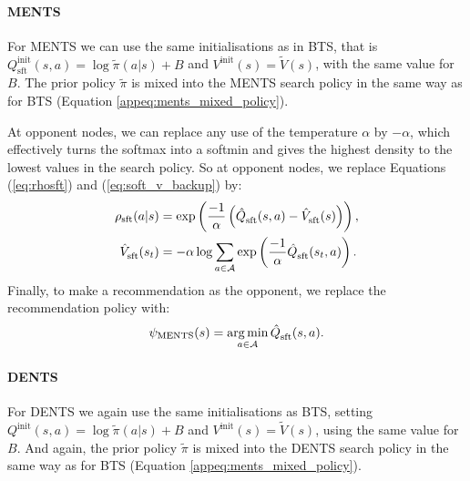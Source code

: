 \documentclass{article}
\newcommand{\cl}[1]{\mathcal{#1}}
\newcommand{\Vst}[2]{\hat{V}^{#2}_{\textnormal{sft}}(#1)}
\newcommand{\Qst}[3]{\hat{Q}^{#3}_{\textnormal{sft}}(#1,#2)}
\DeclareMathOperator*{\argmin}{arg\,min}
\theoremstyle{plain}
\begin{document}
\begin{appendices}
            \paragraph{MENTS}
            For MENTS we can use the same initialisations as in BTS, that is $Q^{\text{init}}_{\text{sft}}(s,a)=\log \tilde{\pi}(a|s)+B$ and $V^{\text{init}}(s)=\tilde{V}(s)$, with the same value for $B$. The prior policy $\tilde{\pi}$ is mixed into the MENTS search policy in the same way as for BTS (Equation \ref{appeq:ments_mixed_policy}). 

            At opponent nodes, we can replace any use of the temperature $\alpha$ by $-\alpha$, which effectively turns the softmax into a softmin and gives the highest density to the lowest values in the search policy. So at opponent nodes, we replace Equations (\ref{eq:rhosft}) and (\ref{eq:soft_v_backup}) by:
            \begin{align}
                \rho_{\textnormal{sft}}(a|s) &= \exp\left(\frac{-1}{\alpha}\left(\Qst{s}{a}{}-\Vst{s}{}\right)\right), \\
                \Vst{s_t}{} &= -\alpha \log \sum_{a\in\cl{A}} \exp \left(\frac{-1}{\alpha}\Qst{s_t}{a}{} \right). 
            \end{align}
            Finally, to make a recommendation as the opponent, we replace the recommendation policy with:
            \begin{align}
                \psi_{\text{MENTS}}(s)=\argmin_{a\in\cl{A}}\Qst{s}{a}{}.
            \end{align}


            \paragraph{DENTS}
            For DENTS we again use the same initialisations as BTS, setting $Q^{\text{init}}(s,a)=\log \tilde{\pi}(a|s)+B$ and $V^{\text{init}}(s)=\tilde{V}(s)$, using the same value for $B$. And again, the prior policy $\tilde{\pi}$ is mixed into the DENTS search policy in the same way as for BTS (Equation \ref{appeq:ments_mixed_policy}). 


\end{appendices}
\end{document}

